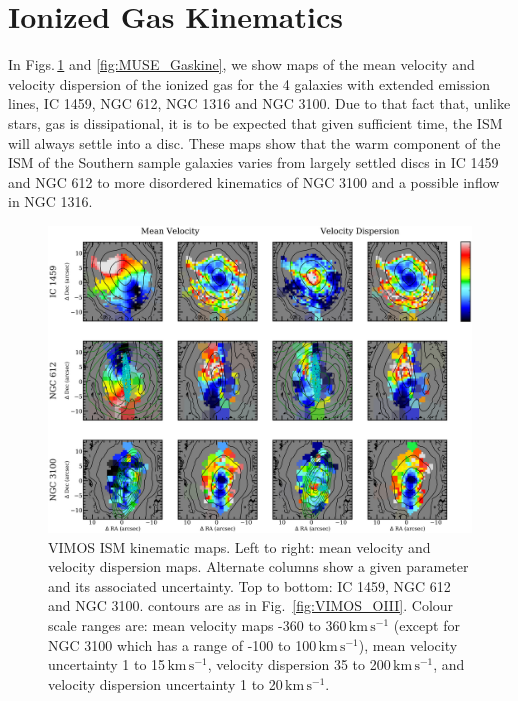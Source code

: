 \section{Ionized Gas Kinematics}
	\label{sec:GasKin}
	In Figs.\,\ref{fig:VIMOS_Gaskine} and \ref{fig:MUSE_Gaskine}, we show maps of the mean velocity and velocity dispersion of the ionized gas for the 4 galaxies with extended emission lines, IC 1459, NGC 612, NGC 1316 and NGC 3100. Due to that fact that, unlike stars, gas is dissipational, it is to be expected that given sufficient time, the ISM will always settle into a disc. These maps show that the warm component of the ISM of the Southern sample galaxies varies from largely settled discs in IC 1459 and NGC 612 to more disordered kinematics of NGC 3100 and a possible inflow in NGC 1316.

	\begin{figure}
		\centering
		\includegraphics[height=0.47\textheight]{chapter5/vimos/kin.png}
		\caption[VIMOS ISM kinematic maps]{VIMOS ISM kinematic maps. Left to right: mean velocity and velocity dispersion maps. Alternate columns show a given parameter and its associated uncertainty. Top to bottom: IC 1459, NGC 612 and NGC 3100. contours are as in Fig.\ \ref{fig:VIMOS_OIII}. Colour scale ranges are: mean velocity maps -360 to 360\,$\mathrm{km \, s^{-1}}$ (except for NGC 3100 which has a range of -100 to 100\,$\mathrm{km \, s^{-1}}$), mean velocity uncertainty 1 to 15\,$\mathrm{km \, s^{-1}}$, velocity dispersion 35 to 200\,$\mathrm{km \, s^{-1}}$, and velocity dispersion uncertainty 1 to 20\,$\mathrm{km \, s^{-1}}$.} 
		\label{fig:VIMOS_Gaskine}
	\end{figure}

